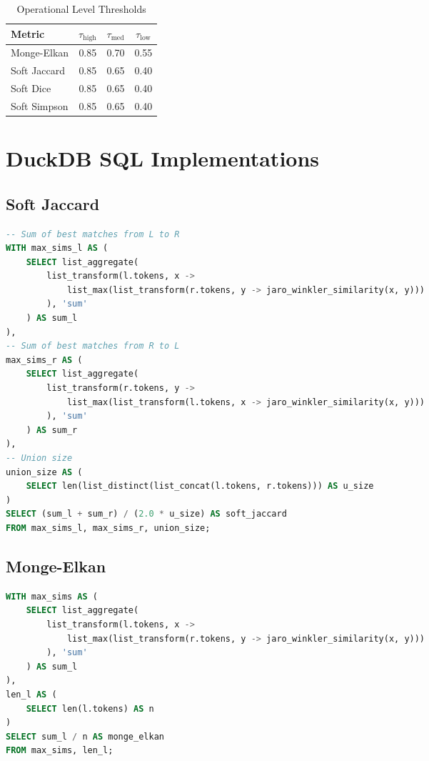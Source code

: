 \begin{table}[htbp]
	\centering
	\caption{Operational Level Thresholds}
	\label{tab:set_thresholds_full}
	\begin{tabular}{lccc}
		\toprule
		\textbf{Metric} & $\tau_{\text{high}}$ & $\tau_{\text{med}}$ & $\tau_{\text{low}}$ \\
		\midrule
		Monge-Elkan     & 0.85                 & 0.70                & 0.55                \\
		Soft Jaccard    & 0.85                 & 0.65                & 0.40                \\
		Soft Dice       & 0.85                 & 0.65                & 0.40                \\
		Soft Simpson    & 0.85                 & 0.65                & 0.40                \\
		\bottomrule
	\end{tabular}
\end{table}

\section{DuckDB SQL Implementations}

\subsection{Soft Jaccard}
\begin{lstlisting}[language=SQL, caption={Soft Jaccard SQL}]
-- Sum of best matches from L to R
WITH max_sims_l AS (
    SELECT list_aggregate(
        list_transform(l.tokens, x ->
            list_max(list_transform(r.tokens, y -> jaro_winkler_similarity(x, y)))
        ), 'sum'
    ) AS sum_l
),
-- Sum of best matches from R to L
max_sims_r AS (
    SELECT list_aggregate(
        list_transform(r.tokens, y ->
            list_max(list_transform(l.tokens, x -> jaro_winkler_similarity(x, y)))
        ), 'sum'
    ) AS sum_r
),
-- Union size
union_size AS (
    SELECT len(list_distinct(list_concat(l.tokens, r.tokens))) AS u_size
)
SELECT (sum_l + sum_r) / (2.0 * u_size) AS soft_jaccard
FROM max_sims_l, max_sims_r, union_size;
\end{lstlisting}

\subsection{Monge-Elkan}
\begin{lstlisting}[language=SQL, caption={Monge-Elkan SQL}]
WITH max_sims AS (
    SELECT list_aggregate(
        list_transform(l.tokens, x ->
            list_max(list_transform(r.tokens, y -> jaro_winkler_similarity(x, y)))
        ), 'sum'
    ) AS sum_l
),
len_l AS (
    SELECT len(l.tokens) AS n
)
SELECT sum_l / n AS monge_elkan
FROM max_sims, len_l;
\end{lstlisting}

